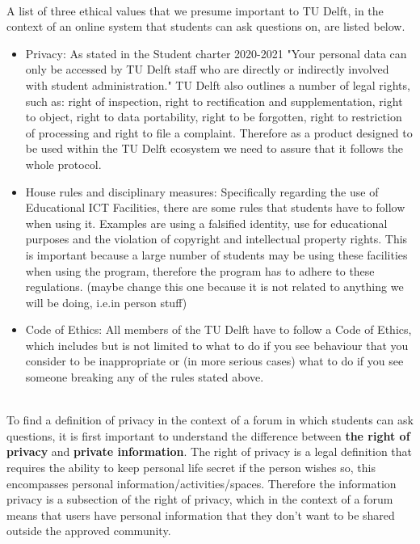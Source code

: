 \documentclass{article}
\begin{document}
\\ A list of three ethical values that we presume important to TU Delft, in the context of an online system that students can ask questions on, are listed below.
\begin{itemize}
    \item Privacy:  As stated in the Student charter 2020-2021 "Your personal data can only be accessed by TU Delft staff who are directly or indirectly involved with student administration."\citep{TUDelftMan} TU Delft also outlines a number of legal rights, such as: right of inspection, right to rectification and supplementation, right to object, right to data portability, right to be forgotten, right to restriction of processing and right to file a complaint.
    Therefore as a product designed to be used within the TU Delft ecosystem we need to assure that it follows the whole protocol.
    \item House rules and disciplinary measures: Specifically regarding the use of Educational ICT Facilities, there are some rules that students have to follow when using it.
    Examples are using a falsified identity, use for educational purposes and  the violation of copyright and intellectual property rights.
    This is important because a large number of students may be using these facilities when using the program, therefore the program has to adhere to these regulations.\citep{TUDelftICT} (maybe change this one because it is not related to anything we will be doing, i.e.in person stuff)
    \item Code of Ethics: All members of the TU Delft have to follow a Code of Ethics, which includes but is not limited to what to do if you see behaviour that you consider to be inappropriate or (in more serious cases) what to do if you see someone breaking any of the rules stated above.\citep{TUDelftMan}
\end{itemize}

\\ To find a definition of privacy in the context of a forum in which students can ask questions, it is first important to understand the difference between \textbf{the right of privacy} and \textbf{private information}.
The right of privacy is a legal definition that requires the ability to keep personal life secret if the person wishes so, this encompasses  personal information/activities/spaces. Therefore the information privacy is a subsection of the right of privacy, which in the context of a forum means that users have personal information that they don't want to be shared outside the approved community.\citep{PrivacyComputing}\\
\end{document}
